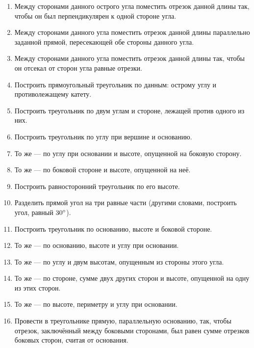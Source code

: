 {\begin{enumerate}
\item
Между сторонами данного острого угла поместить отрезок данной длины так, чтобы он был перпендикулярен к одной стороне угла.

\item
Между сторонами данного угла поместить отрезок данной длины параллельно заданной прямой, пересекающей обе стороны данного угла.

\item
Между сторонами данного угла поместить отрезок данной длины так, чтобы он отсекал от сторон угла равные отрезки.

\item
Построить прямоугольный треугольник по данным:
острому углу и противолежащему катету.

\item
Построить треугольник по двум углам и стороне, лежащей против одного из них.

\item
Построить  треугольник по углу при вершине и основанию.

\item
То же — по углу при основании и высоте, опущенной на боковую сторону.

\item
То же — по боковой стороне и высоте, опущенной на неё.

\item
Построить равносторонний треугольник по его высоте.

\item
Разделить прямой угол на три равные части (другими словами, построить угол, равный  $30\degree$).

\item
Построить треугольник по основанию, высоте и боковой стороне.

\item
То же — по основанию, высоте и углу при основании.

\item
То же — по углу и двум высотам, опущенным из стороны этого угла.

\item
То же — по стороне, сумме двух других сторон и высоте, опущенной на одну из этих сторон.

\item
То же — по высоте, периметру и углу при основании.

\item
Провести в треугольнике прямую, параллельную основанию, так, чтобы отрезок, заключённый между боковыми сторонами, был равен сумме отрезков боковых сторон, считая от основания.


\end{enumerate}}
